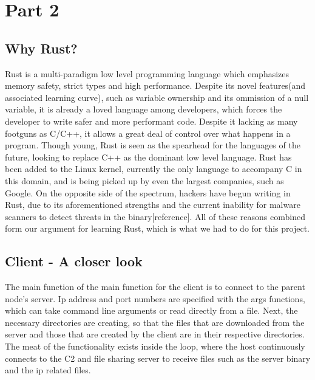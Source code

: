 \documentclass[../main.tex]{subfiles}
\begin{document}
	\chapter{Part 2}


	\section{Why Rust?}


Rust is a multi-paradigm low level programming language which emphasizes memory safety, strict types and high performance. Despite its novel features(and associated learning curve),
such as variable ownership and its ommission of a null variable, it is already a loved language among developers, which forces the developer to write safer and more performant code.
Despite it lacking as many footguns as C/C++, it allows a great deal of control over what happens in a program. Though young, Rust is seen as the spearhead for the languages of the 
future, looking to replace C++ as the dominant low level language. Rust has been added to the Linux kernel, currently the only language to accompany C in this domain, and is being 
picked up by even the largest companies, such as Google. On the opposite side of the spectrum, hackers have begun writing in Rust, due to its aforementioned strengths and the 
current inability for malware scanners to detect threats in the binary[reference]. All of these reasons combined form our argument for learning Rust, which is what we had to do for
this project.

	\vspace{10pt}


	\section{Client - A closer look}


The main function of the main function for the client is to connect to the parent node's server. Ip address and port numbers are specified with the args functions, which can take
command line arguments or read directly from a file. Next, the necessary directories are creating, so that the files that are downloaded from the server and those that are created by
the client are in their respective directories. The meat of the functionality exists inside the loop, where the host continuously connects to the C2 and file sharing server to receive
files such as the server binary and the ip related files. 
	\vspace{10pt}
\end{document}
